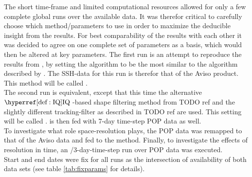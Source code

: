 
The short time-frame and limited computational resources allowed for only a few complete global runs over the available data.
It was therefor critical to carefully choose which method/parameters to use in order to maximize the deducible insight from the results.
For best comparability of the results with each other it was decided to agree on one complete set of parameters as a basis, which would then be altered at key parameters.
The first run is an attempt to reproduce the results from \citet{Chelton2011}, by setting the algorithm to be the most similar to the algorithm described by .  The SSH-data for this run is therefor that of the Aviso product.
This method will be called \MI.\\
 The second run is equivalent, except that this time the alternative $\IQ$-based shape filtering method from TODO ref and the slightly different tracking-filter as described in TODO ref are used. This setting will be called \MII. \MII is then fed with 7-day time-step POP data as well.\\
 To investigate what role space-resolution plays, the POP data was remapped to that of the Aviso data and fed to the \MI method. Finally, to investigate the effects of resolution in time, an \MII/3-day-time-step run over POP data was executed.  \\
  Start and end dates were fix for all runs as the intersection of availability of both data sets (see table \ref{tab:fixparams} for details).



